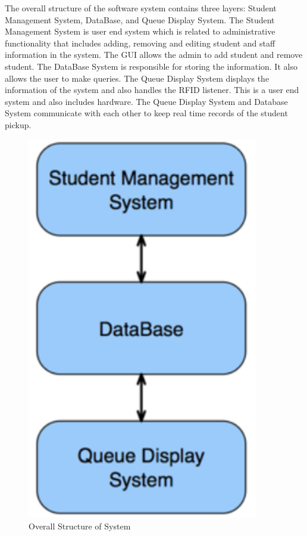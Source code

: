 The overall structure of the software system contains three layers: Student Management System,
DataBase, and Queue Display System. The Student Management System is user end system which
is related to administrative functionality that includes adding, removing and editing student and staff
information in the system. The GUI allows the admin to add student and remove student. The DataBase
System is responsible for storing the information. It also allows the user to make queries. The Queue
Display System displays the information of the system and also handles the RFID listener. This is a user
end system and also includes hardware. The Queue Display System and Database System communicate
with each other to keep real time records of the student pickup.

\begin{figure}[h!]
	\centering
 	\includegraphics[width=0.90\textwidth]{./images/ads_1}
 \caption{Overall Structure of System}
\end{figure}

